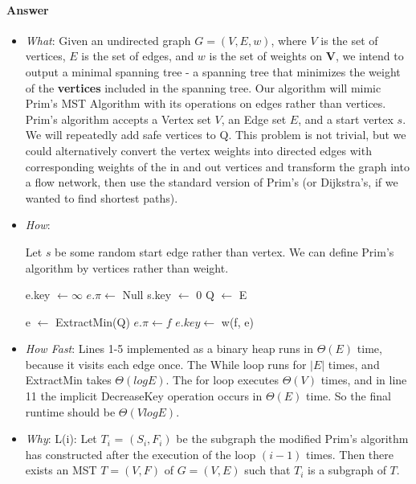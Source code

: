 \documentclass{article}
\begin{document}
\paragraph{Answer}
\begin{itemize}
            \item \emph{What}: Given an undirected graph $G = (V, E, w)$, where $V$ is the set of vertices, $E$ is the set of edges, and $w$ is the set of weights on \textbf{V}, we intend to output a minimal spanning tree - a spanning tree that minimizes the weight of the \textbf{vertices} included in the spanning tree. Our algorithm will mimic Prim's MST Algorithm with its operations on edges rather than vertices. Prim's algorithm accepts a Vertex set $V$, an Edge set $E$, and a start vertex $s$. We will repeatedly add safe vertices to Q. This problem is not trivial, but we could alternatively convert the vertex weights into directed edges with corresponding weights of the in and out vertices and transform the graph into a flow network, then use the standard version of Prim's (or Dijkstra's, if we wanted to find shortest paths).  

            \item \emph{How}:

Let $s$ be some random start edge rather than vertex. We can define Prim's algorithm by vertices rather than weight. 
\begin{algorithmic}
\State e.key $\gets \infty$
\State $e.\pi \gets$ Null
\EndFor
\State s.key $\gets$ 0
\State Q $\gets$ E

\State e $\gets$ ExtractMin(Q)
\State $e.\pi \gets f$
\State $e.key \gets$ w(f, e)
\EndIf
\EndFor
\EndWhile
\EndFunction
\end{algorithmic}

            \item \emph{How Fast}: Lines 1-5 implemented as a binary heap runs in $\Theta(E)$ time, because it visits each edge once. The While loop runs for $|E|$ times, and ExtractMin takes $\Theta(log E).$ The for loop executes $\Theta(V)$ times, and in line 11 the implicit DecreaseKey operation occurs in $\Theta(E)$ time. So the final runtime should be $\Theta(VlogE).$

            \item \emph{Why}: L(i): Let $T_i$ = $(S_i, F_i)$ be the subgraph the modified Prim's algorithm has constructed after the execution of the loop $(i-1)$ times. Then there exists an MST $T=(V,F)$ of $G=(V, E)$ such that $T_i$ is a subgraph of $T$.
        \end{itemize}
\end{document}
